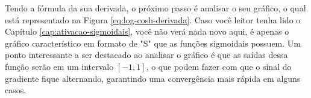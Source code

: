 Tendo a fórmula da sua derivada, o próximo passo é analisar o seu gráfico, o qual está representado na Figura \ref{eq:log-cosh-derivada}. Caso você leitor tenha lido o Capítulo \ref{cap:ativacao-sigmoidais}, você não verá nada novo aqui, é apenas o gráfico característico em formato de "S" que as funções sigmoidais possuem. Um ponto interessante a ser destacado ao analisar o gráfico é que as saídas dessa função serão em um intervalo $[-1, 1]$, o que podem fazer com que o sinal do gradiente fique alternando, garantindo uma convergência mais rápida em alguns casos.

\begin{figure}[h!]
    \centering %

    \begin{subfigure}[b]{0.48\textwidth}
        \centering
\end{subfigure}
\end{figure}
